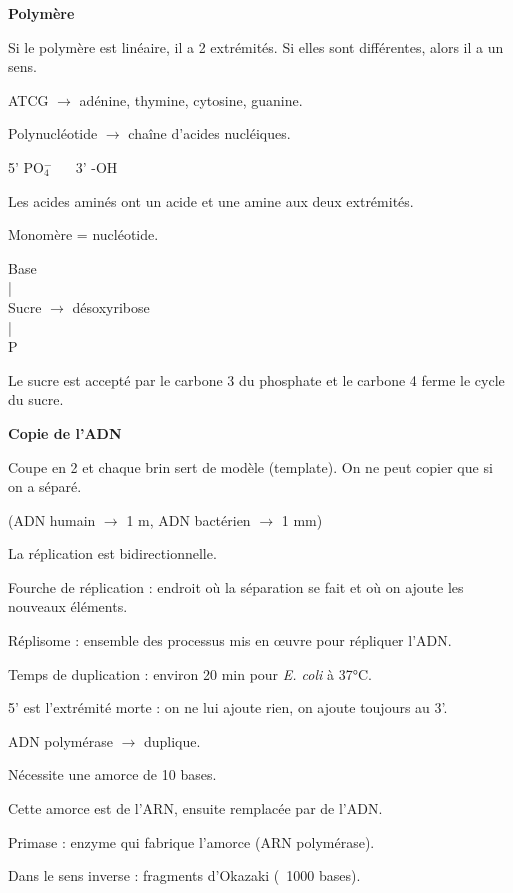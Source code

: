 \documentclass[11pt]{article}
\begin{document}
\textbf{Polymère}

Si le polymère est linéaire, il a 2 extrémités. Si elles sont différentes, alors il a un sens.

ATCG $\rightarrow$ adénine, thymine, cytosine, guanine.

Polynucléotide $\rightarrow$ chaîne d'acides nucléiques.

5' PO$_4^-$ $\quad$ 3' -OH

Les acides aminés ont un acide et une amine aux deux extrémités.

Monomère = nucléotide.

\vspace{0.3cm}

Base\\
\hspace{1cm} |\\
Sucre $\rightarrow$ désoxyribose\\
\hspace{1cm} |\\
P

Le sucre est accepté par le carbone 3 du phosphate et le carbone 4 ferme le cycle du sucre.

\vspace{0.3cm}

\textbf{Copie de l'ADN}

Coupe en 2 et chaque brin sert de modèle (template).  
On ne peut copier que si on a séparé.

(ADN humain $\rightarrow$ 1 m, ADN bactérien $\rightarrow$ 1 mm)

La réplication est bidirectionnelle.

Fourche de réplication : endroit où la séparation se fait et où on ajoute les nouveaux éléments.

Réplisome : ensemble des processus mis en œuvre pour répliquer l'ADN.

Temps de duplication : environ 20 min pour \textit{E. coli} à 37°C.

5' est l'extrémité morte : on ne lui ajoute rien, on ajoute toujours au 3'.

ADN polymérase $\rightarrow$ duplique.

Nécessite une amorce de 10 bases.

Cette amorce est de l'ARN, ensuite remplacée par de l'ADN.

Primase : enzyme qui fabrique l'amorce (ARN polymérase).

Dans le sens inverse : fragments d'Okazaki (~1000 bases).
\end{document}
